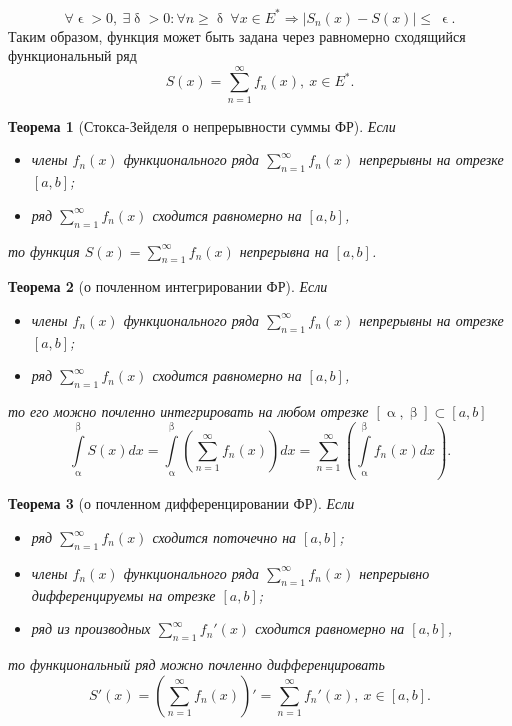\documentclass[a4paper, 12pt]{report}
\numberwithin{equation}{section}
\renewcommand{\leq}{\leqslant}
\renewcommand{\geq}{\geqslant}
\renewcommand{\alpha}{\upalpha}
\renewcommand{\beta}{\upbeta}
\renewcommand{\delta}{\updelta}
\renewcommand{\epsilon}{\upvarepsilon}
\newtheorem*{theorem}{Теорема}
\begin{document}
	\begin{equation}
		\forall \epsilon > 0,\ \exists \delta > 0: \forall n \geq \delta\ \forall x \in E^* \Rightarrow|S_n(x) - S(x) | \leq\ \epsilon.
	\end{equation}
	Таким образом, функция может быть задана через равномерно сходящийся функциональный ряд
	\begin{equation}
		S(x) = \sum_{n=1}^\infty f_n(x),\ x \in E^*.
	\end{equation}
	\begin{theorem}
		[Стокса-Зейделя о непрерывности суммы ФР]
		Если
		\begin{itemize}
			\item члены $f_n(x)$ функционального ряда $\sum_{n=1}^\infty f_n(x)$ непрерывны на отрезке $[a,b]$;
			\item ряд $\sum_{n=1}^\infty f_n(x)$ сходится равномерно на $[a,b]$,
		\end{itemize} 
		то функция $S(x) = \sum_{n=1}^\infty f_n(x)$ непрерывна на $[a,b]$.
	\end{theorem}
	\begin{theorem}
		[о почленном интегрировании ФР]
		Если 
		\begin{itemize}
			\item члены $f_n(x)$ функционального ряда $\sum_{n=1}^\infty f_n(x)$ непрерывны на отрезке $[a,b]$;
			\item ряд $\sum_{n=1}^\infty f_n(x)$ сходится равномерно на $[a,b]$,
		\end{itemize} 
		то его можно почленно интегрировать на любом отрезке $[\alpha, \beta]\subset [a,b]$
		\begin{equation}
			\int\limits_\alpha^\beta S(x)dx = \int\limits_\alpha^\beta \left( \sum_{n=1}^\infty f_n(x)\right)dx = \sum_{n=1}^\infty \left(\int\limits_\alpha^\beta f_n(x) dx \right).
		\end{equation}
	\end{theorem}
	\begin{theorem}
		[о почленном дифференцировании ФР]
		Если
		\begin{itemize}
			\item ряд $\sum_{n=1}^\infty f_n(x)$ сходится поточечно на $[a,b]$;
			\item члены $f_n(x)$ функционального ряда $\sum_{n=1}^\infty f_n(x)$ непрерывно дифференцируемы на отрезке $[a,b]$;
			\item ряд из производных $\sum_{n=1}^\infty f_n'(x)$ сходится равномерно на $[a,b]$,
		\end{itemize}
		то функциональный ряд можно почленно дифференцировать
		\begin{equation}
			S'(x) = \left(\sum_{n=1}^\infty f_n(x)\right)' = \sum_{n=1}^\infty f_n'(x),\ x \in [a,b].
		\end{equation}
	\end{theorem}
\end{document}
